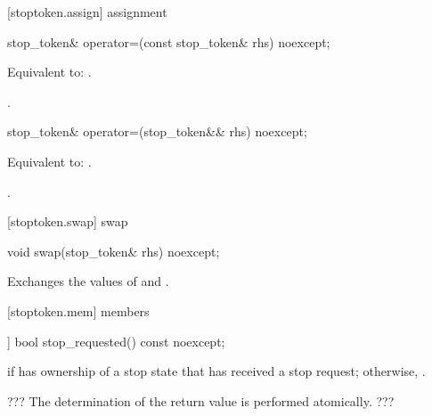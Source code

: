 {%
[stoptoken.assign]{ assignment}

%
\begin{itemdecl}
stop_token& operator=(const stop_token& rhs) noexcept;
\end{itemdecl}
\begin{itemdescr}
  \pnum\effects Equivalent to: .

  \pnum\returns {}.
\end{itemdescr}

%
\begin{itemdecl}
stop_token& operator=(stop_token&& rhs) noexcept;
\end{itemdecl}
\begin{itemdescr}
  \pnum\effects Equivalent to: .

  \pnum\returns {}.
\end{itemdescr}

[stoptoken.swap]{ swap}

%
\begin{itemdecl}
void swap(stop_token& rhs) noexcept;
\end{itemdecl}

\begin{itemdescr}
\pnum
\effects Exchanges the values of  and .
\end{itemdescr}


[stoptoken.mem]{ members}

%
\begin{itemdecl}
[[nodiscard]] bool stop_requested() const noexcept;
\end{itemdecl}
\begin{itemdescr}
  \pnum\returns {} if  has ownership of a stop state that has received a stop request;
                otherwise, .
                
                ??? The determination of the return value is performed atomically. ???

\end{itemdescr}

}
